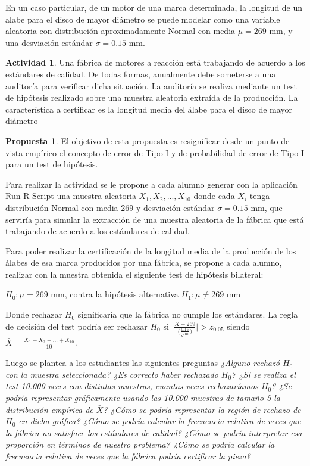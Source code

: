 \documentclass[oneside,spanish]{amsart}
\numberwithin{equation}{section}
\theoremstyle{definition}
\newtheorem{actividad}{Actividad}
\newtheorem{propuesta}{\bfseries Propuesta}
\begin{document}
En un caso particular, de un motor de una marca determinada, la longitud de un alabe para el disco de mayor diámetro se puede modelar como una variable aleatoria con distribución aproximadamente Normal con media $\mu= 269$ mm, y una desviación estándar $\sigma = 0.15$ mm.

\begin{tcolorbox}[arc=0mm,colback=white]
	\begin{actividad}
		Una fábrica de motores a reacción está trabajando de acuerdo a los estándares de calidad. De todas formas, anualmente debe someterse a una auditoría para verificar dicha situación. La auditoría se realiza mediante un test de hipótesis realizado sobre una muestra aleatoria extraída de la producción. La característica a certificar es la longitud media del álabe para el disco de mayor diámetro
	\end{actividad}
\end{tcolorbox}

\begin{propuesta}\label{prop:1}
	El objetivo de esta propuesta es resignificar desde un punto de vista empírico el concepto de error de Tipo I y de probabilidad de error de Tipo I para un test de hipótesis.
\end{propuesta}

Para realizar la actividad se le propone a cada alumno generar con la aplicación Run R Script una muestra aleatoria $X_1, X_2, ..., X_10$ donde cada $X_i$ tenga distribución Normal con media 269 y desviación estándar $\sigma = 0.15$ mm, que serviría para simular la extracción de una muestra aleatoria de la fábrica que está trabajando de acuerdo a los estándares de calidad. 

Para poder realizar la certificación de la longitud media de la producción de los álabes de esa marca producidos por una fábrica, se propone a cada alumno, realizar con la muestra obtenida el siguiente test de hipótesis bilateral:

$H_0: \mu =269$ mm, contra la hipótesis alternativa $H_1: \mu \ne 269$ mm

Donde rechazar $H_0$ significaría que la fábrica no cumple los estándares. La regla de decisión del test podría ser rechazar $H_0$ si $\biggl|\frac{\bar{X} - 269}{\bigl(\frac{0.15}{\sqrt{10}}\bigr)}\biggr| > z_{0.05}$ siendo $\bar{X} = \frac{X_1 + X_2 + ... + X_{10}}{10}$.

Luego se plantea a los estudiantes las siguientes preguntas \textit{¿Alguno rechazó $H_0$ con la muestra seleccionada? ¿Es correcto haber rechazado $H_0$? ¿Si se realiza el test 10.000 veces con distintas muestras, cuantas veces rechazaríamos $H_0$? ¿Se podría representar gráficamente usando las 10.000 muestras de tamaño 5 la distribución empírica de $\bar{X}$? ¿Cómo se podría representar la región de rechazo de $H_0$ en dicha gráfica?  ¿Cómo se podría calcular la frecuencia relativa de veces que la fábrica no satisface los estándares de calidad? ¿Cómo se podría interpretar esa proporción en términos de nuestro problema? ¿Cómo se podría calcular la frecuencia relativa de veces que la fábrica podría certificar la pieza?}
\end{document}
